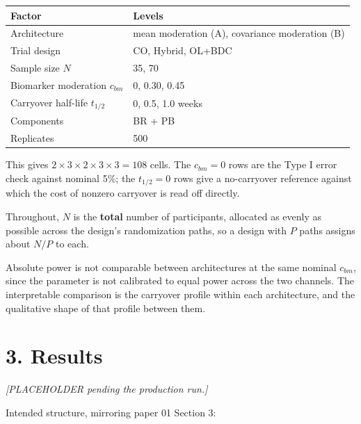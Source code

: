 \documentclass[
  11pt,
]{article}
\newcounter{none} %
\begin{document}
{\def\LTcaptype{none} %
\begin{longtable}[]{@{}ll@{}}
\toprule\noalign{}
Factor & Levels \\
\midrule\noalign{}
\endhead
\bottomrule\noalign{}
\endlastfoot
Architecture & mean moderation (A), covariance moderation (B) \\
Trial design & CO, Hybrid, OL+BDC \\
Sample size \(N\) & 35, 70 \\
Biomarker moderation \(c_{bm}\) & 0, 0.30, 0.45 \\
Carryover half-life \(t_{1/2}\) & 0, 0.5, 1.0 weeks \\
Components & BR + PB \\
Replicates & 500 \\
\end{longtable}
}

This gives \(2 \times 3 \times 2 \times 3 \times 3 = 108\) cells. The
\(c_{bm} = 0\) rows are the Type I error check against nominal 5\%; the
\(t_{1/2} = 0\) rows give a no-carryover reference against which the
cost of nonzero carryover is read off directly.

Throughout, \(N\) is the \textbf{total} number of participants,
allocated as evenly as possible across the design's randomization
paths, so a design with \(P\) paths assigns about \(N/P\) to each.

Absolute power is not comparable between architectures at the same
nominal \(c_{bm}\), since the parameter is not calibrated to equal
power across the two channels. The interpretable comparison is the
carryover profile within each architecture, and the qualitative shape
of that profile between them.

\section{3. Results}

\emph{[PLACEHOLDER pending the production run.]}

Intended structure, mirroring paper 01 Section 3:
\end{document}
